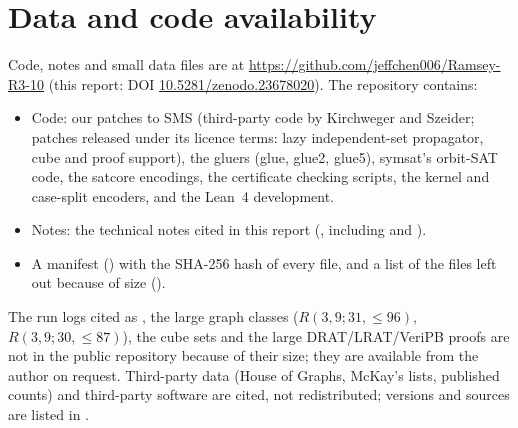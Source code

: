 \section{Data and code availability}\label{sec:data}
Code, notes and small data files are at \url{https://github.com/jeffchen006/Ramsey-R3-10}
(this report: DOI \href{https://doi.org/10.5281/zenodo.23678020}{10.5281/zenodo.23678020}). The repository contains:
\begin{itemize}
\item Code: our patches to SMS (third-party code by Kirchweger and Szeider; patches released under its licence terms:
  lazy independent-set propagator, cube and proof support), the gluers (glue, glue2, glue5), symsat's orbit-SAT
  code, the satcore encodings, the certificate checking scripts, the kernel and case-split encoders, and the
  Lean~4 development.
\item Notes: the technical notes cited in this report (, including  and
  ).
\item A manifest () with the SHA-256 hash of every file, and a list of the files left out
  because of size ().
\end{itemize}
The run logs cited as , the large graph classes ($R(3,9;31,{\le}96)$, $R(3,9;30,{\le}87)$), the cube sets
and the large DRAT/LRAT/VeriPB proofs are not in the public repository because of their size; they are available
from the author on request. Third-party data (House of Graphs, McKay's lists, published counts) and third-party software
are cited, not redistributed; versions and sources are listed in .
